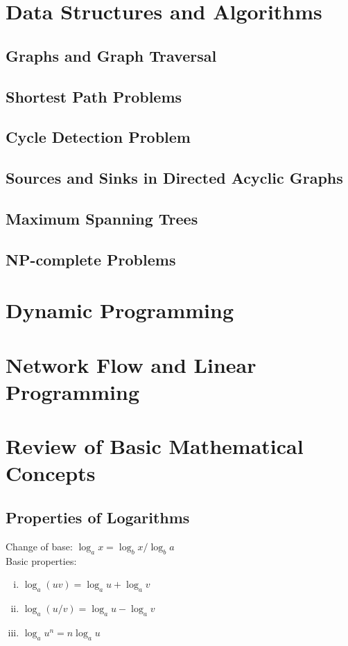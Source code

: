 \documentclass{article}
\begin{document}
	\section{Data Structures and Algorithms}
		\subsection{Graphs and Graph Traversal}
		\subsection{Shortest Path Problems}
		\subsection{Cycle Detection Problem}
		\subsection{Sources and Sinks in Directed Acyclic Graphs}
		\subsection{Maximum Spanning Trees}
		\subsection{NP-complete Problems}
		\clearpage

	\section{Dynamic Programming}
		\clearpage

	\section{Network Flow and Linear Programming}
		\clearpage


	\appendix

	\section{Review of Basic Mathematical Concepts}
		\subsection{Properties of Logarithms}
			Change of base: $\log_a x = \log_b x/\log_b a$ \\
			Basic properties:
			\begin{enumerate}[(i)]
				\item $\log_a(uv) = \log_a u + \log_a v$
				\item $\log_a(u / v) = \log_a u - \log_a v$
				\item $\log_a u^n = n \log_a u$
				\end{enumerate}



	
\end{document}
